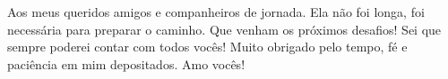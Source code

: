 
\vfill
Aos meus queridos amigos e companheiros de jornada. Ela não foi longa, foi necessária para preparar o caminho. Que venham os próximos desafios! Sei que sempre poderei contar com todos vocês! Muito obrigado pelo tempo, fé e paciência em mim depositados. Amo vocês!